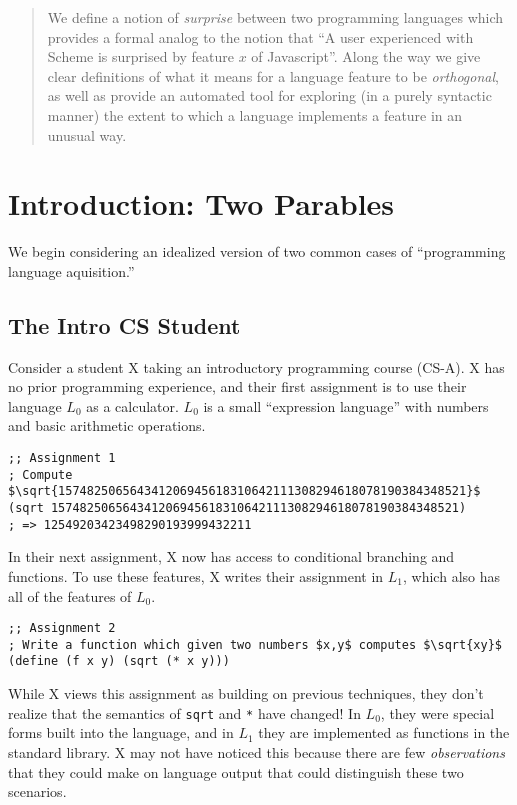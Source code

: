 \documentclass[12pt]{article}
\newcommand{\csa}{\textsc{CS-A}}
\begin{document}
\begin{abstract}

We define a notion of \emph{surprise} between two programming languages which
provides a formal analog to the notion that ``A user experienced with Scheme is
surprised by feature $x$ of Javascript''. Along the way we give clear
definitions of what it means for a language feature to be \emph{orthogonal}, as
well as provide an automated tool for exploring (in a purely syntactic manner)
the extent to which a language implements a feature in an unusual way.

\end{abstract}

\section{Introduction: Two Parables}

We begin considering an idealized version of two common cases of ``programming
language aquisition.''


\subsection{The Intro CS Student}

Consider a student X taking an introductory programming course (\csa). X has no prior
programming experience, and their first assignment is to use their language
$L_0$ as a calculator. $L_0$ is a small ``expression language'' with numbers and
basic arithmetic operations. 

\begin{verbatim}
;; Assignment 1
; Compute $\sqrt{157482506564341206945618310642111308294618078190384348521}$
(sqrt 157482506564341206945618310642111308294618078190384348521)
; => 12549203423498290193999432211
\end{verbatim}

In their next assignment, X now has access to conditional branching and
functions. To use these features, X writes their assignment in $L_1$, which also
has all of the features of $L_0$.

\begin{verbatim}
;; Assignment 2
; Write a function which given two numbers $x,y$ computes $\sqrt{xy}$
(define (f x y) (sqrt (* x y)))
\end{verbatim}

While X views this assignment as building on previous techniques, they don't
realize that the semantics of \verb|sqrt| and \verb|*| have changed!  In $L_0$,
they were special forms built into the language, and in $L_1$ they are
implemented as functions in the standard library. X may not have noticed this
because there are few \emph{observations} that they could make on language output
that could distinguish these two scenarios. 
\end{document}
